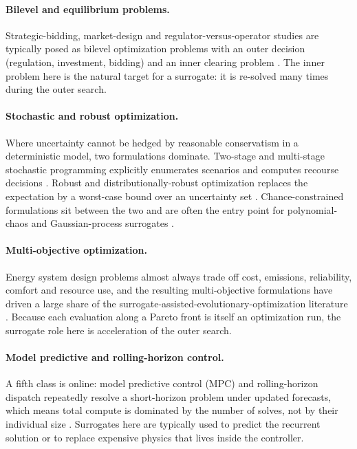 \paragraph{Bilevel and equilibrium problems.}
Strategic-bidding, market-design and regulator-versus-operator
studies are typically posed as bilevel optimization problems with an
outer decision (regulation, investment, bidding) and an inner
clearing problem
\cite{Han2018622,Wu2022231,Wang20211767,Cao2023}.
The inner problem here is the natural target for a surrogate: it is
re-solved many times during the outer search.

\paragraph{Stochastic and robust optimization.}
Where uncertainty cannot be hedged by reasonable conservatism in a
deterministic model, two formulations dominate. Two-stage and
multi-stage stochastic programming explicitly enumerates scenarios
and computes recourse decisions
\cite{Wang20211767,Safta20172535,Hu2021671,Hu2020,Volodina2022,Lawson201647,Lin2023,Pang2023,Zhou20181}.
Robust and distributionally-robust optimization replaces the
expectation by a worst-case bound over an uncertainty set
\cite{Zhou20181,Yang2024,Dong2022,Dong2023,Liang20246508,Giorgetti2020,Fu20202904,Fu2022}.
Chance-constrained formulations sit between the two and are often
the entry point for polynomial-chaos and Gaussian-process surrogates
\cite{Muhlpfordt20194806,Koirala20242284,Xu20212696,Chen2023657,Liang20246508}.

\paragraph{Multi-objective optimization.}
Energy system design problems almost always trade off cost,
emissions, reliability, comfort and resource use, and the resulting
multi-objective formulations have driven a large share of the
surrogate-assisted-evolutionary-optimization literature
\cite{Thrampoulidis2021,Hussien20211883,Wang2017,Schulte2020,Han2018622,Roth2019214,Giorgetti2020,Hirvonen2017323,Sun2020}.
Because each evaluation along a Pareto front is itself an
optimization run, the surrogate role here is acceleration of the
outer search.

\paragraph{Model predictive and rolling-horizon control.}
A fifth class is online: model predictive control (MPC) and
rolling-horizon dispatch repeatedly resolve a short-horizon problem
under updated forecasts, which means total compute is dominated by
the number of solves, not by their individual size
\cite{Dullinger20181646,Lu20232989,Faraji2020157284,Reynolds2017704,Wang20192635,Yang2024,Dong2022}.
Surrogates here are typically used to predict the recurrent solution
or to replace expensive physics that lives inside the controller.

